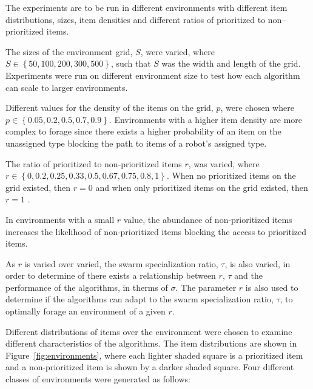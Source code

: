 The experiments are to be run in different environments with different item distributions, sizes, item densities and different ratios of prioritized to non--prioritized items. 

The sizes of the environment grid, $S$, were varied, where $S\in \left\{ 50,100,200,300, 500\right\}$, such that $S$ was the width and length of the grid.  Experiments were run on different environment size to test how each algorithm can scale to larger environments.

Different values for the density of the items on the grid, $p$, were chosen where $p\in\left\{ 0.05, 0.2, 0.5, 0.7, 0.9\right\}$. Environments with a higher item density are more complex to forage since there exists a higher probability of an item on the unassigned type blocking the path to items of a robot's assigned type.

The ratio of prioritized to non-prioritized items $r$, was varied, where $r\in \left\{0, 0.2,0.25, 0.33, 0.5, 0.67, 0.75, 0.8, 1\right\}$. When no prioritized items on the grid existed, then $r=0$ and when only prioritized items on the grid existed, then $r=1$ .

In environments with a small $r$ value, the abundance of non-prioritized items increases the likelihood of non-prioritized items blocking the access to prioritized items. 

As $r$ is varied over varied, the swarm specialization ratio, $\tau$, is also varied, in order to determine of there exists a relationship between $r$, $\tau$ and the performance of the algorithms, in therms of $\sigma$. The parameter $r$ is also used to determine if the algorithms can adapt to the swarm specialization ratio, $\tau$, to optimally forage an environment of a given $r$. 

Different distributions of items over the environment were chosen to examine different characteristics of the algorithms. The item distributions are shown in Figure~\ref{fig:environments}, where each lighter shaded square is a prioritized item and a non-prioritized item is shown by a darker shaded square. Four different classes of environments were generated as follows:

